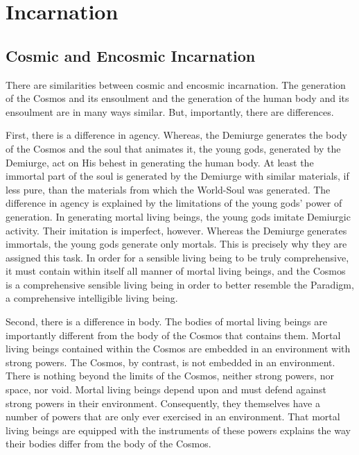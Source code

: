 \chapter{Incarnation} %
\label{cha:incarnation}

\section{Cosmic and Encosmic Incarnation} %
\label{sec:cosmic_and_encosmic_incarnation}

There are similarities between cosmic and encosmic incarnation. The generation of the Cosmos and its ensoulment and the generation of the human body and its ensoulment are in many ways similar. But, importantly, there are differences. 

First, there is a difference in agency. Whereas, the Demiurge generates the body of the Cosmos and the soul that animates it, the young gods, generated by the Demiurge, act on His behest in generating the human body. At least the immortal part of the soul is generated by the Demiurge with similar materials, if less pure, than the materials from which the World-Soul was generated. The difference in agency is explained by the limitations of the young gods' power of generation. In generating mortal living beings, the young gods imitate Demiurgic activity. Their imitation is imperfect, however. Whereas the Demiurge generates immortals, the young gods generate only mortals. This is precisely why they are assigned this task. In order for a sensible living being to be truly comprehensive, it must contain within itself all manner of mortal living beings, and the Cosmos is a comprehensive sensible living being in order to better resemble the Paradigm, a comprehensive intelligible living being. 

Second, there is a difference in body. The bodies of mortal living beings are importantly different from the body of the Cosmos that contains them. Mortal living beings contained within the Cosmos are embedded in an environment with strong powers. The Cosmos, by contrast, is not embedded in an environment. There is nothing beyond the limits of the Cosmos, neither strong powers, nor space, nor void. Mortal living beings depend upon and must defend against strong powers in their environment. Consequently, they themselves have a number of powers that are only ever exercised in an environment. That mortal living beings are equipped with the instruments of these powers explains the way their bodies differ from the body of the Cosmos.

